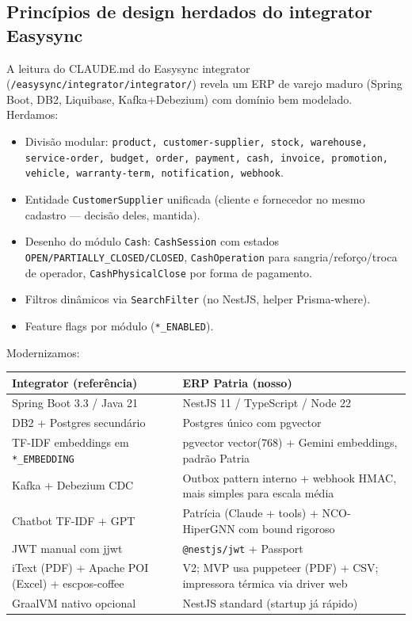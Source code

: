 \documentclass[11pt,a4paper]{article}
\begin{document}
\subsection{Princípios de design herdados do integrator Easysync}

A leitura do CLAUDE.md do Easysync integrator
(\texttt{/easysync/integrator/integrator/}) revela um ERP de varejo
maduro (Spring Boot, DB2, Liquibase, Kafka+Debezium) com domínio bem
modelado. Herdamos:

\begin{itemize}[leftmargin=2em]
  \item Divisão modular: \texttt{product, customer-supplier, stock,
        warehouse, service-order, budget, order, payment, cash, invoice,
        promotion, vehicle, warranty-term, notification, webhook}.
  \item Entidade \texttt{CustomerSupplier} unificada (cliente e fornecedor
        no mesmo cadastro --- decisão deles, mantida).
  \item Desenho do módulo \texttt{Cash}: \texttt{CashSession} com estados
        \texttt{OPEN/PARTIALLY\_CLOSED/CLOSED}, \texttt{CashOperation}
        para sangria/reforço/troca de operador, \texttt{CashPhysicalClose}
        por forma de pagamento.
  \item Filtros dinâmicos via \texttt{SearchFilter} (no NestJS, helper
        Prisma-where).
  \item Feature flags por módulo (\texttt{*\_ENABLED}).
\end{itemize}

Modernizamos:

\begin{longtable}{@{}p{5.5cm}p{8cm}@{}}
\toprule
\textbf{Integrator (referência)} & \textbf{ERP Patria (nosso)} \\
\midrule
\endhead
Spring Boot 3.3 / Java 21 & NestJS 11 / TypeScript / Node 22 \\
DB2 + Postgres secundário & Postgres único com pgvector \\
TF-IDF embeddings em \texttt{*\_EMBEDDING} & pgvector vector(768) + Gemini
embeddings, padrão Patria \\
Kafka + Debezium CDC & Outbox pattern interno + webhook HMAC, mais simples
para escala média \\
Chatbot TF-IDF + GPT & Patrícia (Claude + tools) + NCO-HiperGNN com bound
rigoroso \\
JWT manual com jjwt & \texttt{@nestjs/jwt} + Passport \\
iText (PDF) + Apache POI (Excel) + escpos-coffee & V2; MVP usa
puppeteer (PDF) + CSV; impressora térmica via driver web \\
GraalVM nativo opcional & NestJS standard (startup já rápido) \\
\bottomrule
\end{longtable}
\end{document}
